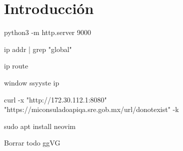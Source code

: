 


\section{Introducción}



python3 -m http.server 9000

ip addr | grep "global"

ip route 

window ssyyste ip 

curl -x "http://172.30.112.1:8080" "https://miconsuladoapiqa.sre.gob.mx/url/donotexist" -k


sudo apt install neovim


Borrar todo
ggVG


